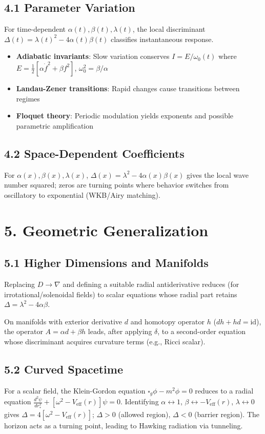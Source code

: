 \documentclass[11pt]{article}
\begin{document}
\subsection{4.1 Parameter Variation}
For time-dependent $\alpha(t), \beta(t), \lambda(t)$, the local discriminant $\Delta(t) = \lambda(t)^2 - 4\alpha(t)\beta(t)$ classifies instantaneous response.
\begin{itemize}
\item \textbf{Adiabatic invariants}: Slow variation conserves $I = E/\omega_0(t)$ where $E = \frac{1}{2}[\alpha\dot f^2 + \beta f^2]$, $\omega_0^2 = \beta/\alpha$
\item \textbf{Landau-Zener transitions}: Rapid changes cause transitions between regimes
\item \textbf{Floquet theory}: Periodic modulation yields exponents and possible parametric amplification
\end{itemize}

\subsection{4.2 Space-Dependent Coefficients}
For $\alpha(x), \beta(x), \lambda(x)$, $\Delta(x) = \lambda^2 - 4\alpha(x)\beta(x)$ gives the local wave number squared; zeros are turning points where behavior switches from oscillatory to exponential (WKB/Airy matching).

\section{5. Geometric Generalization}

\subsection{5.1 Higher Dimensions and Manifolds}
Replacing $D \to \nabla$ and defining a suitable radial antiderivative reduces (for irrotational/solenoidal fields) to scalar equations whose radial part retains $\Delta = \lambda^2 - 4\alpha\beta$.

On manifolds with exterior derivative $d$ and homotopy operator $h$ ($dh+hd=\mathrm{id}$), the operator $A = \alpha d + \beta h$ leads, after applying $\delta$, to a second-order equation whose discriminant acquires curvature terms (e.g., Ricci scalar).

\subsection{5.2 Curved Spacetime}
For a scalar field, the Klein-Gordon equation $\square_g\phi - m^2\phi = 0$ reduces to a radial equation $\frac{d^2\psi}{dr_*^2} + [\omega^2 - V_{\text{eff}}(r)]\psi = 0$. Identifying $\alpha\leftrightarrow1$, $\beta\leftrightarrow -V_{\text{eff}}(r)$, $\lambda\leftrightarrow0$ gives $\Delta = 4[\omega^2 - V_{\text{eff}}(r)]$; $\Delta>0$ (allowed region), $\Delta<0$ (barrier region). The horizon acts as a turning point, leading to Hawking radiation via tunneling.
\end{document}
